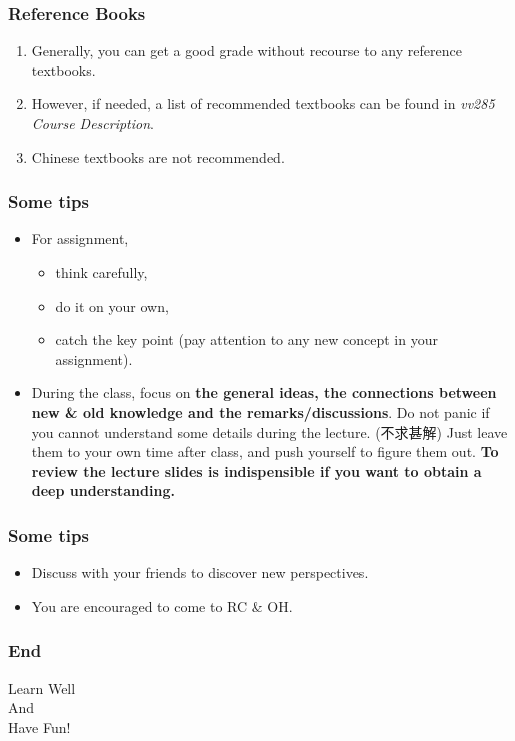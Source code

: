 \documentclass[UTF8]{beamer}
\begin{document}
\begin{frame}
    \frametitle{Reference Books}
    \begin{enumerate}
        \item Generally, you can get a good grade without recourse to any reference textbooks.
        \item However, if needed, a list of recommended textbooks can be found in \textit{vv285 Course Description}.
        \item Chinese textbooks are not recommended.
    \end{enumerate}
\end{frame}

\begin{frame}
    \frametitle{Some tips}
    \begin{itemize}
        \item
              For assignment,
              \begin{itemize}
                  \item think carefully,
                  \item do it on your own,
                  \item catch the key point (pay attention to any new concept in your assignment).
              \end{itemize}
        \item During the class, focus on \textbf{the general ideas, the connections between new \& old knowledge and the remarks/discussions}. Do not panic if you cannot understand some details during the lecture. (不求甚解) Just leave them to your own time after class, and push yourself to figure them out. \textbf{To review the lecture slides is indispensible if you want to obtain a deep understanding.}
    \end{itemize}
\end{frame}

\begin{frame}
    \frametitle{Some tips}
    \begin{itemize}
        \item Discuss with your friends to discover new perspectives.
        \item You are encouraged to come to RC \& OH.
    \end{itemize}
\end{frame}

\begin{frame}
    \frametitle{End}
    \begin{center}
        \huge
        Learn Well\\
        And\\
        Have Fun!\\
    \end{center}
\end{frame}
\end{document}
